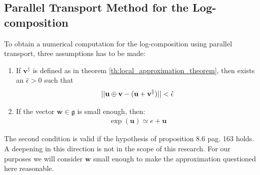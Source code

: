 \subsection{Parallel Transport Method for the Log-composition}
To obtain a numerical computation for the log-composition using parallel transport, three assumptions has to be made: 
\begin{enumerate}
	\item If $\mathbf{v}^{\parallel} $ is defined as in theorem \ref{th:local_approximation_theorem}, then exists an $\hat{\epsilon} > 0$ such that
	\begin{align*}
	\vert\lvert 
		\mathbf{u}\oplus \mathbf{v}  
		-
		(
		\mathbf{u} + \mathbf{v}^{\parallel} 
		)
	 \rvert\vert <\hat{\epsilon}
	\end{align*}
	\item If the vector $\mathbf{w}\in\mathfrak{g}$ is small enough, then:
		\begin{align*}
		\exp(\mathbf{u}) \simeq e + \mathbf{u}
		\end{align*}
\end{enumerate}
The second condition is valid if the hypothesis of proposition 8.6 pag. 163 \cite{younes2010shapes} holds. A deepening in this direction is not in the scope of this research. For our purposes we will consider $\mathbf{w}$ small enough to make the approximation questioned here reasonable.\\

